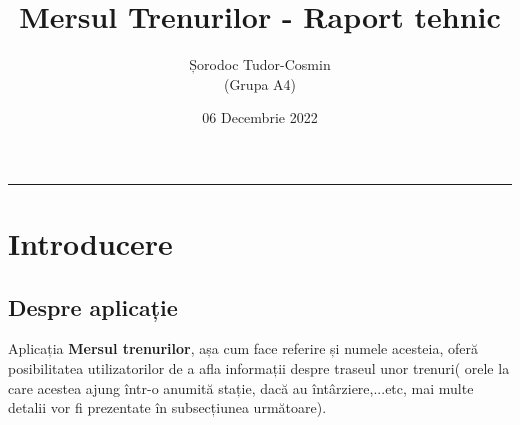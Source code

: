 \documentclass[runningheads]{llncs}
\begin{document}
%
\title{Mersul Trenurilor - Raport tehnic}
%
%
\author{Șorodoc Tudor-Cosmin \\ (Grupa A4)}
\date{06 Decembrie 2022}
%
\maketitle              %
%
\begin{center}
\end{center}
\par\noindent\rule{\textwidth}{0.4pt}
\section{Introducere}
\subsection{Despre aplicație}
Aplicația \textbf{Mersul trenurilor}, așa cum face referire și numele acesteia, oferă posibilitatea utilizatorilor de a afla informații despre traseul unor trenuri( orele la care acestea ajung într-o anumită stație, dacă au întârziere,...etc, mai multe detalii vor fi prezentate în subsecțiunea următoare).
\end{document}
